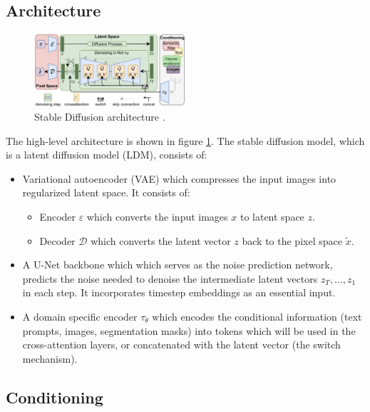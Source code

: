 \subsection{Architecture}

\begin{figure}
    \centering
    \includegraphics[width=0.5\textwidth]{images/diffusion_models/stable_diffusion/architecture.png}
    \caption{Stable Diffusion architecture \cite{stable_diffusion}.}
    \label{fig:stable_diffusion_architecture}
\end{figure}

The high-level architecture is shown in figure \ref{fig:stable_diffusion_architecture}. The stable diffusion model, which is a latent diffusion model (LDM), consists of: 

\begin{itemize}
    \item Variational autoencoder (VAE) which compresses the input images into regularized latent space. It consists of:
    \begin{itemize}
        \item Encoder $\varepsilon$ which converts the input images $x$ to latent space $z$.
        \item Decoder $\mathcal{D}$ which converts the latent vector $z$ back to the pixel space $\tilde{x}$.
    \end{itemize}
    \item A U-Net backbone which which serves as the noise prediction network, predicts the noise needed to denoise the intermediate latent vectors $z_T, ..., z_1$ in each step. It incorporates timestep embeddings as an essential input.
    \item A domain specific encoder $\tau_\theta$ which encodes the conditional information (text prompts, images, segmentation masks) into tokens which will be used in the cross-attention layers, or concatenated with the latent vector (the switch mechanism).
\end{itemize}







\subsection{Conditioning}

